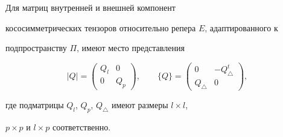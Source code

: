 \begin{cors} Для матриц внутренней и внешней компонент


кососимметрических тензоров относительно репера $E$, адаптированного к


подпространству $\Pi$, имеют место представления


$$


|Q|=


\begin{pmatrix}


Q_l & 0 \\ 0 & Q_p


\end{pmatrix}


,\qquad


\{ Q\} =


\begin{pmatrix}


0 & -Q^t_\triangle\\


Q_\triangle & 0


\end{pmatrix}


,


$$


где подматрицы $Q_l$, $Q_p$, $Q_\triangle$ имеют размеры $l\times l$,


$p\times p$ и $l\times p$ соответственно.


\end{cors}






